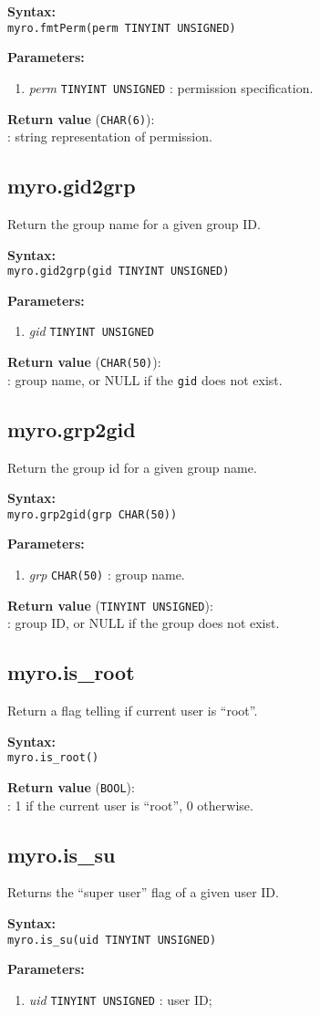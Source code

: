 \documentclass[12pt,titlepage]{article}
\newcommand{\syntax}[1]
{
  \bigskip
  \noindent
  \textbf{Syntax: } \\ 
  \indent \texttt{#1}
}
\newenvironment{parameters}
{
  \bigskip
  \noindent
  \textbf{Parameters:}
  \begin{enumerate}
}
{
  \end{enumerate}
}
\newcommand{\param}[2]
{
  \item \textit{#1} \texttt{#2} 
}
\newcommand{\return}[1]
{
  \bigskip
  \noindent
  \textbf{Return value} (\texttt{#1}): \\
  \indent
}
\begin{document}
\syntax{myro.fmtPerm(perm TINYINT UNSIGNED)}

\begin{parameters}
\param{perm}{TINYINT UNSIGNED}: permission specification.
\end{parameters}

\return{CHAR(6)}: string representation of permission.

%
\subsection{myro.gid2grp}
Return the group name for a given group ID.

\syntax{myro.gid2grp(gid TINYINT UNSIGNED)}

\begin{parameters}
\param{gid}{TINYINT UNSIGNED}
\end{parameters}

\return{CHAR(50)}: group name, or NULL if the \verb|gid| does not exist.




\subsection{myro.grp2gid}
Return the group id for a given group name.

\syntax{myro.grp2gid(grp CHAR(50))}

\begin{parameters}
\param{grp}{CHAR(50)}: group name.
\end{parameters}

\return{TINYINT UNSIGNED}: group ID, or NULL if the group does not
exist.


\subsection{myro.is\_root}
Return a flag telling if current user is ``root''.

\syntax{myro.is\_root()}

\return{BOOL}: 1 if the current user is ``root'', 0 otherwise.

%
\subsection{myro.is\_su}
Returns the ``super user'' flag of a given user ID.

\syntax{myro.is\_su(uid TINYINT UNSIGNED)}

\begin{parameters}
\param{uid}{TINYINT UNSIGNED}: user ID;
\end{parameters}
\end{document}
